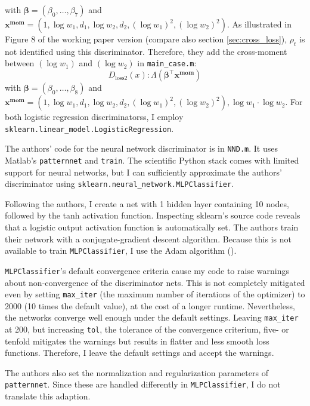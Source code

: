 with $\mathbf{\beta} = (\beta_0, \dots, \beta_7)$ and $\mathbf{x^{mom}} = (1, \log w_1, d_1, \log w_2, d_2, (\log w_1)^2, (\log w_2)^2)$.
As illustrated in Figure 8 of the working paper version (compare also section \ref{sec:cross_loss}), $\rho_t$ is not identified using this discriminator.
Therefore, they add the cross-moment between $(\log w_1)$ and $(\log w_2)$ in \texttt{main\_case.m}:
\begin{equation}
    D_{\text{loss2}}(x) : \Lambda(\mathbf{\beta}^{\intercal} \mathbf{x^{mom}})
\end{equation}
with $\mathbf{\beta} = (\beta_0, \dots, \beta_8)$ and $\mathbf{x^{mom}} = (1, \log w_1, d_1, \log w_2, d_2, (\log w_1)^2, (\log w_2)^2), \log w_1 \cdot \log w_2$.
For both logistic regression discriminatorss, I employ \texttt{sklearn.linear\_model.LogisticRegression}.

The authors' code for the neural network discriminator is in \texttt{NND.m}.
It uses Matlab's \texttt{patternnet} and \texttt{train}.
The scientific Python stack comes with limited support for neural networks, but I can sufficiently approximate the authors' discriminator using \texttt{sklearn.neural\_network.MLPClassifier}.

Following the authors, I create a net with 1 hidden layer containing 10 nodes, followed by the tanh activation function.
Inspecting sklearn's source code reveals that a logistic output activation function is automatically set. %
The authors train their network with a conjugate-gradient descent algorithm.
Because this is not available to train \texttt{MLPClassifier}, I use the Adam algorithm (\textcite{diederik2014adam}).

\texttt{MLPClassifier}'s default convergence criteria cause my code to raise warnings about non-convergence of the discriminator nets.
This is not completely mitigated even by setting \texttt{max\_iter} (the maximum number of iterations of the optimizer) to 2000 (10 times the default value), at the cost of a longer runtime. %
Nevertheless, the networks converge well enough under the default settings. %
Leaving \texttt{max\_iter} at 200, but increasing \texttt{tol}, the tolerance of the convergence criterium, five- or tenfold mitigates the warnings but results in flatter and less smooth loss functions. %
Therefore, I leave the default settings and accept the warnings.

The authors also set the normalization and regularization parameters of \texttt{patternnet}.
Since these are handled differently in \texttt{MLPClassifier}, I do not translate this adaption.

